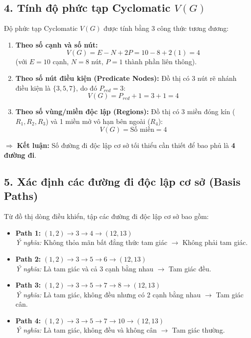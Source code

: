\documentclass[11pt,a4paper]{article}
\begin{document}
\subsection*{4. Tính độ phức tạp Cyclomatic $V(G)$}
Độ phức tạp Cyclomatic $V(G)$ được tính bằng 3 công thức tương đương:
\begin{enumerate}[noitemsep]
    \item \textbf{Theo số cạnh và số nút:}
    \[
    V(G) = E - N + 2P = 10 - 8 + 2(1) = 4
    \]
    (với $E=10$ cạnh, $N=8$ nút, $P=1$ thành phần liên thông).
    \item \textbf{Theo số nút điều kiện (Predicate Nodes):}
    Đồ thị có 3 nút rẽ nhánh điều kiện là $\{3, 5, 7\}$, do đó $P_{red} = 3$:
    \[
    V(G) = P_{red} + 1 = 3 + 1 = 4
    \]
    \item \textbf{Theo số vùng/miền độc lập (Regions):}
    Đồ thị có 3 miền đóng kín ($R_1, R_2, R_3$) và 1 miền mở vô hạn bên ngoài ($R_4$):
    \[
    V(G) = \text{Số miền} = 4
    \]
\end{enumerate}
$\Rightarrow$ \textbf{Kết luận:} Số đường đi độc lập cơ sở tối thiểu cần thiết để bao phủ là \textbf{4 đường đi}.

\subsection*{5. Xác định các đường đi độc lập cơ sở (Basis Paths)}
Từ đồ thị dòng điều khiển, tập các đường đi độc lập cơ sở bao gồm:
\begin{itemize}[noitemsep]
    \item \textbf{Path 1:} $(1,2) \to 3 \to 4 \to (12,13)$ \\
    \textit{Ý nghĩa:} Không thỏa mãn bất đẳng thức tam giác $\rightarrow$ Không phải tam giác.
    \item \textbf{Path 2:} $(1,2) \to 3 \to 5 \to 6 \to (12,13)$ \\
    \textit{Ý nghĩa:} Là tam giác và cả 3 cạnh bằng nhau $\rightarrow$ Tam giác đều.
    \item \textbf{Path 3:} $(1,2) \to 3 \to 5 \to 7 \to 8 \to (12,13)$ \\
    \textit{Ý nghĩa:} Là tam giác, không đều nhưng có 2 cạnh bằng nhau $\rightarrow$ Tam giác cân.
    \item \textbf{Path 4:} $(1,2) \to 3 \to 5 \to 7 \to 10 \to (12,13)$ \\
    \textit{Ý nghĩa:} Là tam giác, không đều và không cân $\rightarrow$ Tam giác thường.
\end{itemize}
\end{document}
